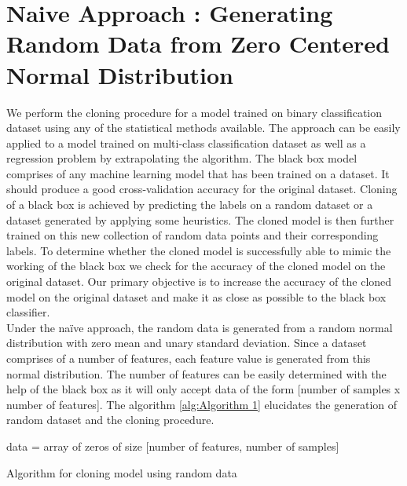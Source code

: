 \documentclass[9pt,twocolumn,twoside]{pnas-new}
\begin{document}
\section*{Naive Approach : Generating Random Data from Zero Centered Normal Distribution}

We perform the cloning procedure for a model trained on binary classification dataset using any of the statistical methods available. The approach can be easily applied to a model trained on multi-class classification dataset as well as a regression problem by extrapolating the algorithm. The black box model comprises of any machine learning model that has been trained on a dataset. It should produce a good cross-validation accuracy for the original dataset. Cloning of a black box is achieved by predicting the labels on a random dataset or a dataset generated by applying some heuristics. The cloned model is then further trained on this new collection of random data points and their corresponding labels. To determine whether the cloned model is successfully able to mimic the working of the black box we check for the accuracy of the cloned model on the original dataset. Our primary objective is to increase the accuracy of the cloned model on the original dataset and make it as close as possible to the black box classifier.\\
Under the naïve approach, the random data is generated from a random normal distribution with zero mean and unary standard deviation. Since a dataset comprises of a number of features, each feature value is generated from this normal distribution. The number of features can be easily determined with the help of the black box as it will only accept data of the form [number of samples x number of features]. The algorithm \ref{alg:Algorithm 1} elucidates the generation of random dataset and the cloning procedure.\\

\begin{algorithm2e}
 data = array of zeros of size [number of features, number of samples]\;
 \caption{Algorithm for cloning model using random data}
 \label{alg:Algorithm 1}
\end{algorithm2e}
\end{document}
